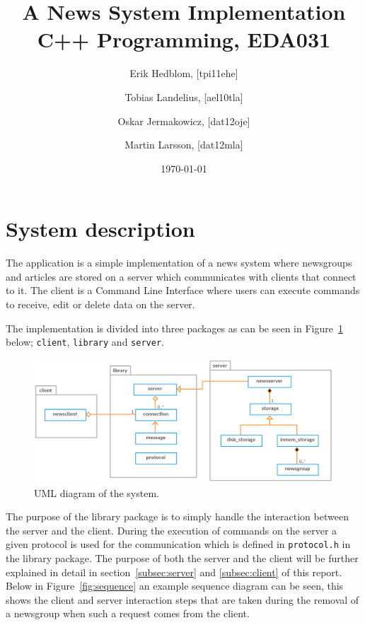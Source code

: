 \documentclass[a4paper]{article}
\title{A News System Implementation \\ C++ Programming, EDA031}
\author{Erik Hedblom, [tpi11ehe]
\and Tobias Landelius, [ael10tla]
\and Oskar Jermakowicz, [dat12oje]
\and Martin Larsson, [dat12mla]}
\date{\today}
\begin{document}
\maketitle

\newpage
\renewcommand{\contentsname}{Table of contents}
\tableofcontents
\newpage

\section{System description}
The application is a simple implementation of a news system where newsgroups and articles are stored on a server which communicates with clients that connect to it. The client is a Command Line Interface where users can execute commands to receive, edit or delete data on the server.

The implementation is divided into three packages as can be seen in Figure~\ref{fig:uml} below; \texttt{client}, \texttt{library} and \texttt{server}.

\begin{figure}[h]
    \centering
    \includegraphics[width=1.0\textwidth]{uml_diagram.png}
    \caption{UML diagram of the system.}
    \label{fig:uml}
\end{figure}

The purpose of the library package is to simply handle the interaction between the server and the client. During the execution of commands on the server a given protocol is used for the communication which is defined in \texttt{protocol.h} in the library package. The purpose of both the server and the client will be further explained in detail in section~\ref{subsec:server} and \ref{subsec:client} of this report. Below in Figure~\ref{fig:sequence} an example sequence diagram can be seen, this shows the client and server interaction steps that are taken during the removal of a newsgroup when such a request comes from the client.
\end{document}
